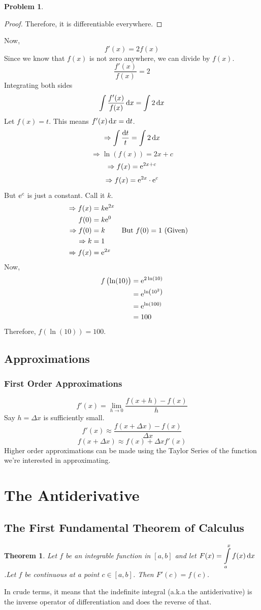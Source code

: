 \documentclass[14]{article}
\newtheorem{theorem}{Theorem}
\theoremstyle{definition}
\newtheorem{prob}{Problem}
\theoremstyle{case}
\begin{document}
\begin{prob}
\begin{proof}
Therefore, it is differentiable everywhere.
\end{proof}
Now,
\[f'(x) = 2f(x)\]
Since we know that $f(x)$ is not zero anywhere, we can divide by $f(x)$.
\[\dfrac{f'(x)}{f(x)} = 2\]
Integrating both sides\\
\[\int\dfrac{f'(x)}{f(x)} \dif x = \int 2 \dif x\]
Let $f(x) = t$. This means $f'(x) \dif x = \dif t$.
\[\Rightarrow \int \dfrac{\dif t}{t} = \int 2\dif x\]
\[\Rightarrow \ln \left(f(x) \right) = 2x + c\]
\[\Rightarrow f(x) = {\rm e}^{2x+c} \]
\[\Rightarrow f(x) = {\rm e}^{2x} \cdot {\rm e}^c\]
But ${\rm e}^c$ is just a constant. Call it $k$.
\begin{align*}
\Rightarrow f(x) &= k {\rm e}^{2x}\\
f(0) &= k{\rm e}^0\\
\Rightarrow f(0) &= k && \text{But } f(0) = 1 \text{ (Given)}\\
\Rightarrow k &= 1\\
\Rightarrow f(x) &= {\rm e}^{2x}
\end{align*}
Now,
\begin{align*}
f\left(\ln(10)\right) &= {\rm e}^{2 \ln(10)}\\
&= {\rm e}^{\ln\left(10^2\right)}\\
&= {\rm e}^{\ln(100)}\\
&= 100
\end{align*}
Therefore, $f\left(\ln(10)\right) = 100$.
\end{prob}
\subsection{Approximations}
\subsubsection{First Order Approximations}
\[f'(x) = \lim\limits_{h \to 0} \dfrac{f(x+h) - f(x)}{h}\]
Say $h = \Delta x$ is sufficiently small.
\[f'(x) \approx \dfrac{f(x + \Delta x) - f(x)}{\Delta x}\]
\[f(x + \Delta x) \approx f(x) + \Delta x f'(x)\]
Higher order approximations can be made using the Taylor Series of the function we're interested in approximating.
\pagebreak
\section{The Antiderivative}
\subsection{The First Fundamental Theorem of Calculus}
\begin{theorem}
Let $f$ be an integrable function in $[a, b]$ and let $F(x) = \displaystyle\int\limits_a^x f(x) \dif x$.Let $f$ be continuous at a point $c \in [a, b]$. Then $F'(c) = f(c)$.
\end{theorem}
In crude terms, it means that the indefinite integral (a.k.a the antiderivative) is the inverse operator of differentiation and does the reverse of that.
\end{document}
